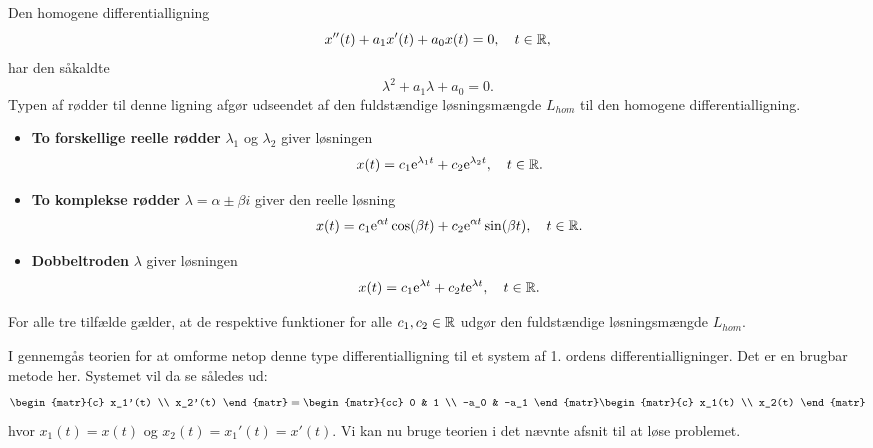 \begin{theorem} \label{saet.difflig2.hom1}
Den homogene differentialligning
\begin{equation}
x''(t) + a_1x'(t) + a_0x(t) = 0, \quad t \in \mathbb{R}, \label{lig.difflig2.hom1}
\end{equation}
har den såkaldte 
\begin{equation}
\lambda^2 + a_1 \lambda + a_0 = 0.
\end{equation}
Typen af rødder til denne ligning afgør udseendet af den fuldstændige løsningsmængde $ L_{hom} $ til den homogene differentialligning.
\begin{itemize}
\item \textbf{To forskellige reelle rødder} $ \lambda_1 $ og $ \lambda_2 $ giver løsningen 
\begin{equation}
x(t) = c_1\mathrm{e}^{\lambda_1 t} + c_2\mathrm{e}^{\lambda_2 t}, \quad t \in \mathbb{R}.
\end{equation}
\item \textbf{To komplekse rødder} $ \lambda = \alpha \pm \beta i $ giver den reelle løsning
\begin{equation} \label{lig.kompl1}
x(t) = c_1\mathrm{e}^{\alpha t}\cos(\beta t) + c_2\mathrm{e}^{\alpha t}\sin(\beta t), \quad t \in \mathbb{R}.
\end{equation}
\item \textbf{Dobbeltroden} $ \lambda $ giver løsningen
\begin{equation}
x(t) = c_1\mathrm{e}^{\lambda t} + c_2 t \mathrm{e}^{\lambda t}, \quad t \in \mathbb{R}.
\end{equation}
\end{itemize}
For alle tre tilfælde gælder, at de respektive funktioner for alle $ c_1,c_2 \in \mathbb{R} $ udgør den fuldstændige løsningsmængde $ L_{hom} $.
\end{theorem}

\begin{info}
I  gennemgås teorien for at omforme netop denne type differentialligning til et system af 1. ordens differentialligninger. Det er en brugbar metode her. Systemet vil da se således ud:
\begin{equation}
\begin{matr}{c} x_1'(t) \\ x_2'(t) \end{matr} = \begin{matr}{cc} 0 & 1 \\ -a_0 & -a_1 \end{matr} \begin{matr}{c} x_1(t) \\ x_2(t) \end{matr}
\end{equation}
hvor $ x_1(t) = x(t) $ og $ x_2(t) = x_1'(t) = x'(t) $. Vi kan nu bruge teorien i det nævnte afsnit til at løse problemet.
\end{info}

